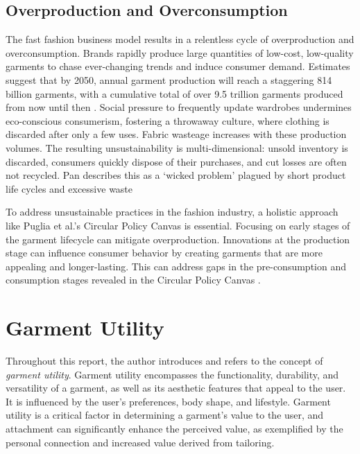 \subsection{Overproduction and Overconsumption}
The fast fashion business model results in a relentless cycle of overproduction and overconsumption. Brands rapidly produce large quantities of low-cost, low-quality garments to chase ever-changing trends and induce consumer demand. Estimates suggest that by 2050, annual garment production will reach a staggering 814 billion garments, with a cumulative total of over 9.5 trillion garments produced from now until then \cite{charter_accelerating_2024}. Social pressure to frequently update wardrobes undermines eco-conscious consumerism, fostering a throwaway culture, where clothing is discarded after only a few uses. Fabric wasteage increases with these production volumes. The resulting unsustainability is multi-dimensional: unsold inventory is discarded, consumers quickly dispose of their purchases, and cut losses are often not recycled. Pan describes this as a `wicked problem' plagued by short product life cycles and excessive waste \cite{charter_accelerating_2024}

To address unsustainable practices in the fashion industry, a holistic approach like Puglia et al.'s Circular Policy Canvas is essential. Focusing on early stages of the garment lifecycle can mitigate overproduction. Innovations at the production stage can influence consumer behavior by creating garments that are more appealing and longer-lasting. This can address gaps in the pre-consumption and consumption stages revealed in the Circular Policy Canvas \cite{puglia_circular_2024}.

\section{Garment Utility}
Throughout this report, the author introduces and refers to the concept of \textit{garment utility}. Garment utility encompasses the functionality, durability, and versatility of a garment, as well as its aesthetic features that appeal to the user. It is influenced by the user's preferences, body shape, and lifestyle. Garment utility is a critical factor in determining a garment's value to the user, and attachment can significantly enhance the perceived value, as exemplified by the personal connection and increased value derived from tailoring.

